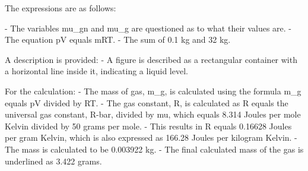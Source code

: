 The expressions are as follows:

- The variables mu_gn and mu_g are questioned as to what their values are.
- The equation pV equals mRT.
- The sum of 0.1 kg and 32 kg.

A description is provided:
- A figure is described as a rectangular container with a horizontal line inside it, indicating a liquid level.

For the calculation:
- The mass of gas, m_g, is calculated using the formula m_g equals pV divided by RT.
- The gas constant, R, is calculated as R equals the universal gas constant, R-bar, divided by mu, which equals 8.314 Joules per mole Kelvin divided by 50 grams per mole.
- This results in R equals 0.16628 Joules per gram Kelvin, which is also expressed as 166.28 Joules per kilogram Kelvin.
- The mass is calculated to be 0.003922 kg.
- The final calculated mass of the gas is underlined as 3.422 grams.